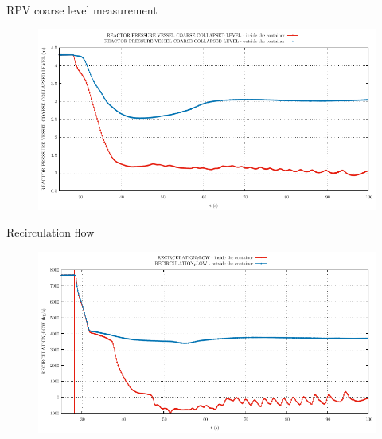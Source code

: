\begin{frame}{RPV coarse level measurement}
	\begin{figure}
		\centering
		\includegraphics[width=\textwidth]{./graphs/REACTOR PRESSURE VESSEL COARSE COLLAPSED LEVEL_comp.pdf}
		
	\end{figure}
	
\end{frame}



\begin{frame}{Recirculation flow}
	\begin{figure}
		\centering
		\includegraphics[width=\textwidth]{./graphs/RECIRCULATION_FLOW_comp.pdf}
		
	\end{figure}
	
\end{frame}

